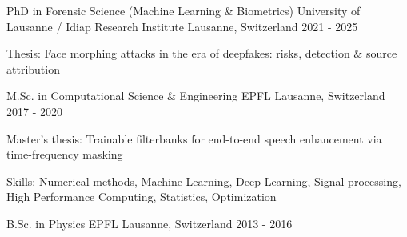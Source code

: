 

\begin{cventries}

  \cventry
    {PhD in Forensic Science (Machine Learning \& Biometrics)} %
    {University of Lausanne / Idiap Research Institute} %
    {Lausanne, Switzerland} %
    {2021 - 2025} %
    {
      \begin{cvitems} %
        \item {Thesis: Face morphing attacks in the era of deepfakes: risks, detection \& source attribution}
      \end{cvitems}
    }

  \cventry
    {M.Sc. in Computational Science \& Engineering} %
    {EPFL} %
    {Lausanne, Switzerland} %
    {2017 - 2020} %
    {
      \begin{cvitems} %
        \item {Master's thesis: Trainable filterbanks for end-to-end speech enhancement via time-frequency masking}
        \item {Skills: Numerical methods, Machine Learning, Deep Learning, Signal processing, High Performance Computing, Statistics, Optimization}
      \end{cvitems}
    }

  \cventry
    {B.Sc. in Physics} %
    {EPFL} %
    {Lausanne, Switzerland} %
    {2013 - 2016} %
    {
    }

\end{cventries}
